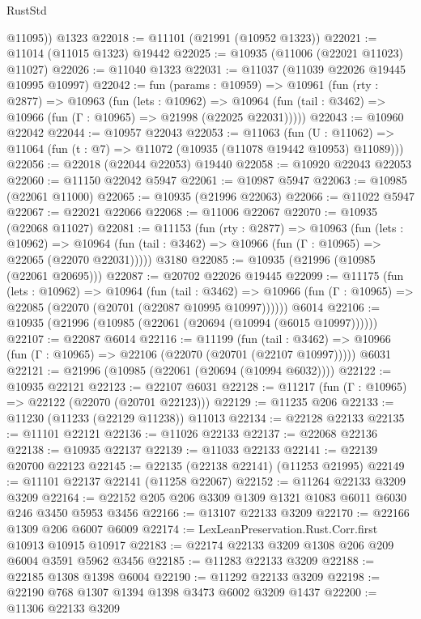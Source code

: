 \begin{lexlean}{RustStd}
\begin{coremodule}
{\begin{coremodule}
{{{{{{{{{{{{{{{{{{{{{{{{{{{{{{{{{{{{{{{{{{{{{{{{{{{{{{{{{{{{{{{{{{{{{{{{{{{{{{{{{{{{{        @11095))
    @1323
@22018 := @11101 (@21991 (@10952 @1323))
@22021 := @11014 (@11015 @1323) @19442
@22025 := @10935 (@11006 (@22021 @11023) @11027)
@22026 := @11040 @1323
@22031 := @11037 (@11039 @22026 @19445 @10995 @10997)
@22042 := fun (params : @10959) =>
  @10961
    (fun (rty : @2877) =>
    @10963
      (fun (lets : @10962) =>
      @10964 (fun (tail : @3462) => @10966 (fun (Γ : @10965) => @21998 (@22025 @22031)))))
@22043 := @10960 @22042
@22044 := @10957 @22043
@22053 := @11063
    (fun (U : @11062) => @11064 (fun (t : @7) => @11072 (@10935 (@11078 @19442 @10953) @11089)))
@22056 := @22018 (@22044 @22053) @19440
@22058 := @10920 @22043 @22053
@22060 := @11150 @22042 @5947
@22061 := @10987 @5947
@22063 := @10985 (@22061 @11000)
@22065 := @10935 (@21996 @22063)
@22066 := @11022 @5947
@22067 := @22021 @22066
@22068 := @11006 @22067
@22070 := @10935 (@22068 @11027)
@22081 := @11153
    (fun (rty : @2877) =>
    @10963
      (fun (lets : @10962) =>
      @10964 (fun (tail : @3462) => @10966 (fun (Γ : @10965) => @22065 (@22070 @22031)))))
    @3180
@22085 := @10935 (@21996 (@10985 (@22061 @20695)))
@22087 := @20702 @22026 @19445
@22099 := @11175
    (fun (lets : @10962) =>
    @10964
      (fun (tail : @3462) =>
      @10966 (fun (Γ : @10965) => @22085 (@22070 (@20701 (@22087 @10995 @10997))))))
    @6014
@22106 := @10935 (@21996 (@10985 (@22061 (@20694 (@10994 (@6015 @10997))))))
@22107 := @22087 @6014
@22116 := @11199
    (fun (tail : @3462) => @10966 (fun (Γ : @10965) => @22106 (@22070 (@20701 (@22107 @10997)))))
    @6031
@22121 := @21996 (@10985 (@22061 (@20694 (@10994 @6032))))
@22122 := @10935 @22121
@22123 := @22107 @6031
@22128 := @11217 (fun (Γ : @10965) => @22122 (@22070 (@20701 @22123)))
@22129 := @11235 @206
@22133 := @11230 (@11233 (@22129 @11238)) @11013
@22134 := @22128 @22133
@22135 := @11101 @22121
@22136 := @11026 @22133
@22137 := @22068 @22136
@22138 := @10935 @22137
@22139 := @11033 @22133
@22141 := @22139 @20700 @22123
@22145 := @22135 (@22138 @22141) (@11253 @21995)
@22149 := @11101 @22137 @22141 (@11258 @22067)
@22152 := @11264 @22133 @3209 @3209
@22164 := @22152 @205 @206 @3309 @1309 @1321 @1083 @6011 @6030 @246 @3450 @5953 @3456
@22166 := @13107 @22133 @3209
@22170 := @22166 @1309 @206 @6007 @6009
@22174 := LexLeanPreservation.Rust.Corr.first @10913 @10915 @10917
@22183 := @22174 @22133 @3209 @1308 @206 @209 @6004 @3591 @5962 @3456
@22185 := @11283 @22133 @3209
@22188 := @22185 @1308 @1398 @6004
@22190 := @11292 @22133 @3209
@22198 := @22190 @768 @1307 @1394 @1398 @3473 @6002 @3209 @1437
@22200 := @11306 @22133 @3209
}}}}}}}}}}}}}}}}}}}}}}}}}}}}}}}}}}}}}}}}}}}}}}}}}}}}}}}}}}}}}}}}}}}}}}}}}}}}}}}}}}}}}
\end{coremodule}}
\end{coremodule}
\end{lexlean}
